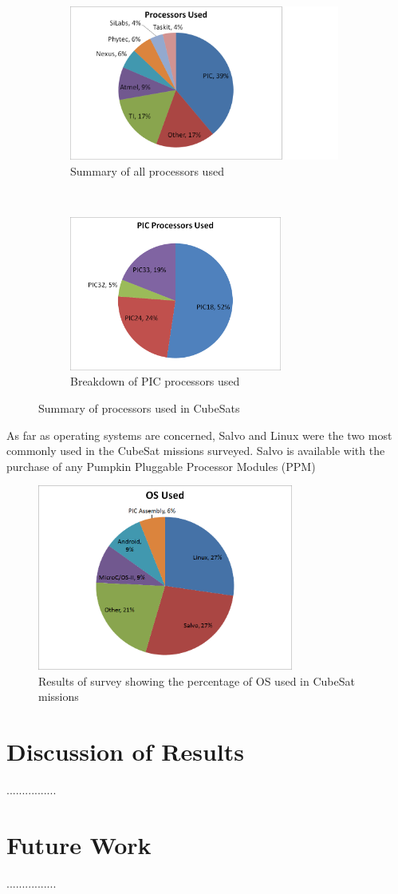 \documentclass[11pt]{article}
\begin{document}
\begin{figure}[t!]
    \centering
    \begin{subfigure}[t]{0.5\textwidth}
        \centering
        \includegraphics[height=2in]{Pie_Processors}
        \caption{Summary of all processors used}
    \end{subfigure}%
    ~ 
    \begin{subfigure}[t]{0.5\textwidth}
        \centering
        \includegraphics[height=2in]{Pie_PIC}
        \caption{Breakdown of PIC processors used}
    \end{subfigure}
    \caption{Summary of processors used in CubeSats}
		\label{processors}
\end{figure}

As far as operating systems are concerned, Salvo and Linux were the two most commonly used in the CubeSat missions surveyed.  Salvo is available with the purchase of any Pumpkin Pluggable Processor Modules (PPM) 


\begin{figure}[ht!]
\centering
\includegraphics[width=0.75\textwidth]{Pie_OS}
\caption{Results of survey showing the percentage of OS used in CubeSat missions}
\label{OS}
\end{figure}

\section{Discussion of Results}
................
\section{Future Work}
................



\end{document}
